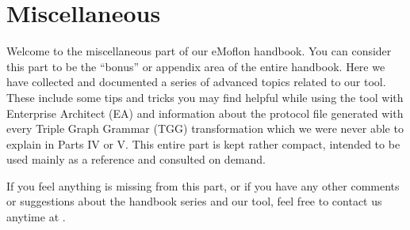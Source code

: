\part{Miscellaneous}
\label{chap:misc}
\newpage

\genHeader

Welcome to the miscellaneous part of our eMoflon handbook.
You can consider this part to be the \enquote{bonus} or appendix area of the entire handbook. 
Here we have collected and documented a series of advanced topics related to our tool.
These include some tips and tricks you may find helpful while using the tool with Enterprise Architect (EA) and information about the protocol file generated with every Triple Graph Grammar (TGG) transformation which we were never able to explain in Parts IV or V.
This entire part is kept rather compact, intended to be used mainly as a reference and consulted on demand.

If you feel anything is missing from this part, or if you have any other comments or suggestions about the handbook series and our tool, feel free to contact us anytime at \eMoflonContact.

 









\tableofcontents




